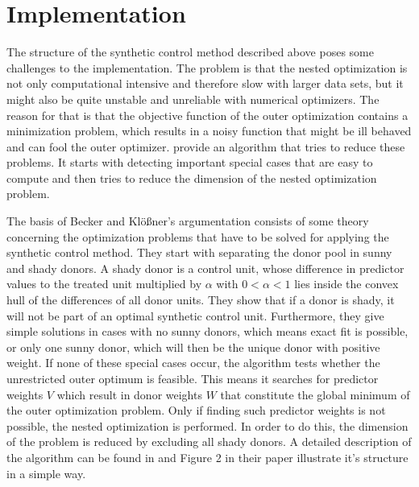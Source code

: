 \documentclass[10pt, a4paper]{article}
\begin{document}
\section{Implementation} %
\label{sec:implementation} 

The structure of the synthetic control method described above poses some challenges to the implementation. The problem is that the nested optimization is not only computational intensive and therefore slow with larger data sets, but it might also be quite unstable and unreliable with numerical optimizers. The reason for that is that the objective function of the outer optimization contains a minimization problem, which results in a noisy function that might be ill behaved and can fool the outer optimizer. \citet{Becker2018} provide an algorithm that tries to reduce these problems. It starts with detecting important special cases that are easy to compute and then tries to reduce the dimension of the nested optimization problem.

The basis of Becker and Klößner's argumentation consists of some theory concerning the optimization problems that have to be solved for applying the synthetic control method. They start with separating the donor pool in sunny and shady donors. A shady donor is a control unit, whose difference in predictor values to the treated unit multiplied by $\alpha$ with $0<\alpha<1$ lies inside the convex hull of the differences of all donor units. They show that if a donor is shady, it will not be part of an optimal synthetic control unit. Furthermore, they give simple solutions in cases with no sunny donors, which means exact fit is possible, or only one sunny donor, which will then be the unique donor with positive weight. If none of these special cases occur, the algorithm tests whether the unrestricted outer optimum is feasible. This means it searches for predictor weights $V$ which result in donor weights $W$ that constitute the global minimum of the outer optimization problem. Only if finding such predictor weights is not possible, the nested optimization is performed. In order to do this, the dimension of the problem is reduced by excluding all shady donors. A detailed description of the algorithm can be found in \citet{Becker2018} and Figure 2 in their paper illustrate it's structure in a simple way.
\end{document}
